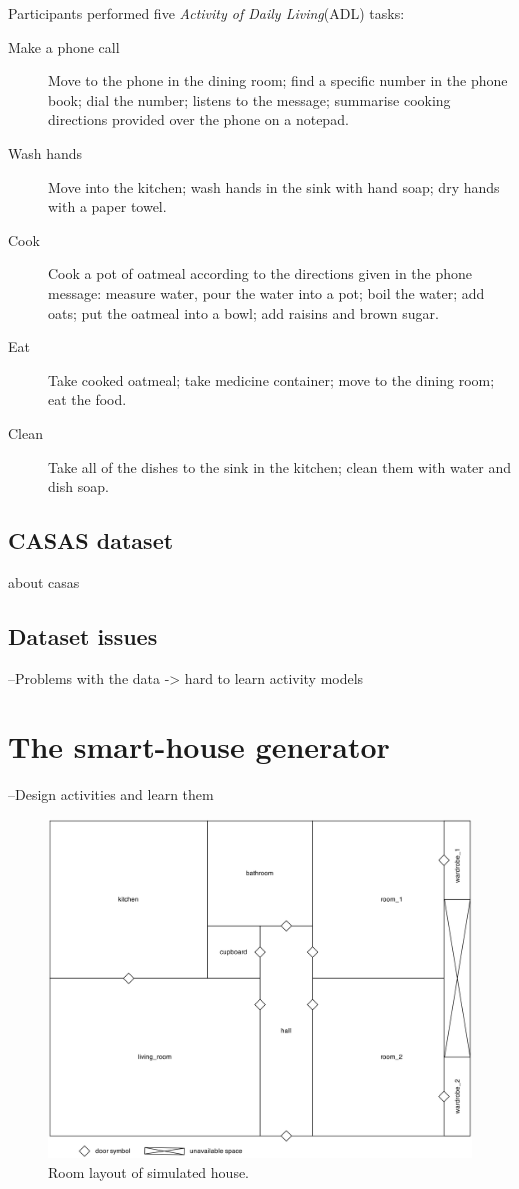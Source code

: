 \documentclass[12pt, a4paper, pdflatex, leqno, twoside, openright]{report}
\begin{document}
Participants performed five \emph{Activity of Daily Living}(ADL) tasks:
\begin{description}
\item[Make a phone call] Move to the phone in the dining room; find a specific number in the phone book; dial the number; listens to the message; summarise cooking directions provided over the phone on a notepad.
\item[Wash hands] Move into the kitchen; wash hands in the sink with hand soap; dry hands with a paper towel.
\item[Cook] Cook a pot of oatmeal according to the directions given in the phone message: measure water, pour the water into a pot; boil the water; add oats; put the oatmeal into a bowl; add raisins and brown sugar.
\item[Eat] Take cooked oatmeal; take medicine container; move to the dining room; eat the food.
\item[Clean] Take all of the dishes to the sink in the kitchen; clean them with water and dish soap.
\end{description}

    \subsection{CASAS dataset}
about casas
    \subsection{Dataset issues}
--Problems with the data -> hard to learn activity models

  \section{The smart-house generator}
--Design activities and learn them

\begin{figure}
  \centering
  \includegraphics[width=.9\textwidth]{./gfx/room_layout}
  \caption{Room layout of simulated house.}
\end{figure}
\end{document}
